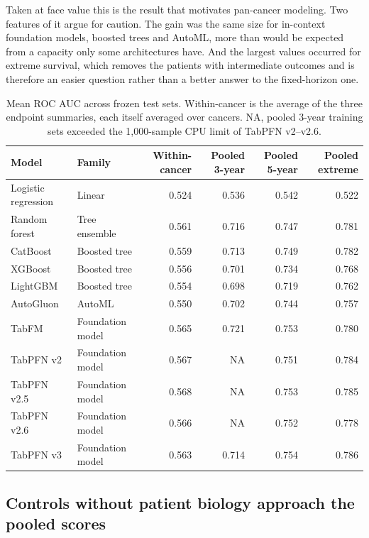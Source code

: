 \documentclass[pdflatex,sn-nature]{sn-jnl}
\begin{document}
Taken at face value this is the result that motivates pan-cancer modeling. Two features of it argue for caution. The gain was the same size for in-context foundation models, boosted trees and AutoML, more than would be expected from a capacity only some architectures have. And the largest values occurred for extreme survival, which removes the patients with intermediate outcomes and is therefore an easier question rather than a better answer to the fixed-horizon one.

\begin{table}[ht]
\centering
\caption{Mean ROC AUC across frozen test sets. Within-cancer is the average of the three endpoint summaries, each itself averaged over cancers. NA, pooled 3-year training sets exceeded the 1,000-sample CPU limit of TabPFN v2--v2.6.}
\label{tab:model_auc}
\footnotesize\setlength{\tabcolsep}{3pt}\begin{tabular}{llrrrr}
\toprule
Model & Family & Within-cancer & Pooled 3-year & Pooled 5-year & Pooled extreme \\
\midrule
Logistic regression & Linear & 0.524 & 0.536 & 0.542 & 0.522 \\
Random forest & Tree ensemble & 0.561 & 0.716 & 0.747 & 0.781 \\
CatBoost & Boosted tree & 0.559 & 0.713 & 0.749 & 0.782 \\
XGBoost & Boosted tree & 0.556 & 0.701 & 0.734 & 0.768 \\
LightGBM & Boosted tree & 0.554 & 0.698 & 0.719 & 0.762 \\
AutoGluon & AutoML & 0.550 & 0.702 & 0.744 & 0.757 \\
TabFM & Foundation model & 0.565 & 0.721 & 0.753 & 0.780 \\
TabPFN v2 & Foundation model & 0.567 & NA & 0.751 & 0.784 \\
TabPFN v2.5 & Foundation model & 0.568 & NA & 0.753 & 0.785 \\
TabPFN v2.6 & Foundation model & 0.566 & NA & 0.752 & 0.778 \\
TabPFN v3 & Foundation model & 0.563 & 0.714 & 0.754 & 0.786 \\
\bottomrule
\end{tabular}

\end{table}

\subsection*{Controls without patient biology approach the pooled scores}
\end{document}
